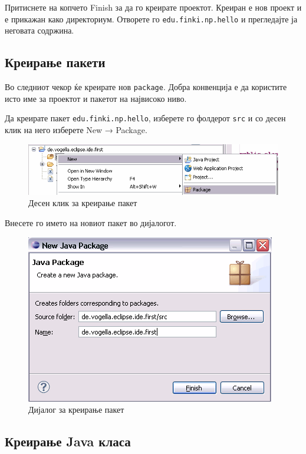Притиснете на копчето Finish за да го креирате проектот. Креиран е нов проект и
е прикажан како директориум. Отворете го \texttt{edu.finki.np.hello} и
прегледајте ја неговата содржина.

\subsection{Креирање пакети}

Во следниот чекор ќе креирате нов \texttt{package}. Добра конвенција е да
користите исто име за проектот и пакетот на највисоко ниво.

Да креирате пакет \texttt{edu.finki.np.hello}, изберете го фолдерот
\texttt{src} и со десен клик на него изберете New → Package.

\begin{figure}
\centering
\includegraphics[scale=.5]{images/package}
\caption{Десен клик за креирање пакет}
\end{figure}

Внесете го името на новиот пакет во дијалогот.

\begin{figure}
\centering
\includegraphics[scale=.5]{images/pkg_name}
\caption{Дијалог за креирање пакет}
\end{figure}

\subsection{Креирање Java класа}

